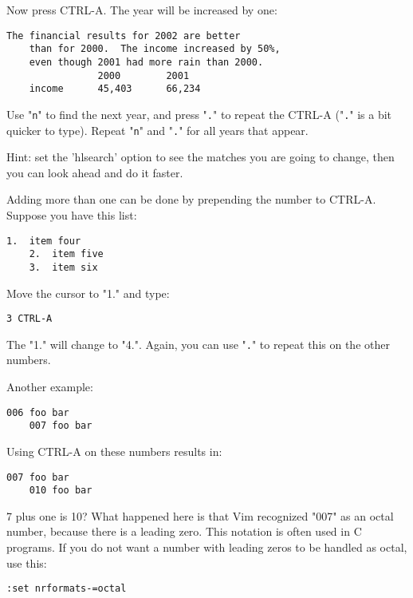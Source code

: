 Now press CTRL-A.
The year will be increased by one:

\begin{Verbatim}[samepage=true]
    The financial results for 2002 are better 
    than for 2000.  The income increased by 50%, 
    even though 2001 had more rain than 2000. 
                2000        2001 
    income      45,403      66,234 
\end{Verbatim}

Use "\verb!n!" to find the next year, and press "\verb!.!" to repeat the CTRL-A ("\verb!.!" is a bit quicker to type).
Repeat "\verb!n!" and "\verb!.!" for all years that appear.

Hint: set the 'hlsearch' option to see the matches you are going to change, then you can look ahead and do it faster.

Adding more than one can be done by prepending the number to CTRL-A.
Suppose you have this list:

\begin{Verbatim}[samepage=true]
    1.  item four 
    2.  item five 
    3.  item six 
\end{Verbatim}

Move the cursor to "1." and type:

\begin{Verbatim}[samepage=true]
 3 CTRL-A
\end{Verbatim}

The "1." will change to "4.".
Again, you can use "\verb!.!" to repeat this on the other numbers.

Another example:

\begin{Verbatim}[samepage=true]
    006 foo bar 
    007 foo bar 
\end{Verbatim}

Using CTRL-A on these numbers results in:

\begin{Verbatim}[samepage=true]
    007 foo bar 
    010 foo bar 
\end{Verbatim}

7 plus one is 10?  What happened here is that Vim recognized "007" as an octal number, because there is a leading zero.
This notation is often used in C programs.
If you do not want a number with leading zeros to be handled as octal, use this:

\begin{Verbatim}[samepage=true]
 :set nrformats-=octal
\end{Verbatim}

